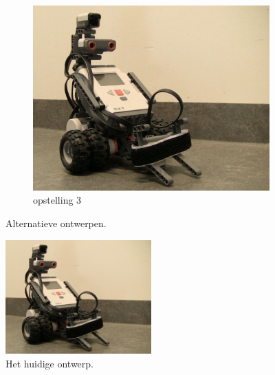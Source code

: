 \documentclass[tt3]{penoverslag}
\begin{document}
\begin{figure}
\begin{subfigure}[h]{0.325\textwidth}
		\centering
		\includegraphics[width=\textwidth]{robotOud3}
		\caption{opstelling 3}
		\label{fig:robotOud3}
	\end{subfigure}
\caption{Alternatieve ontwerpen.}
\label{fig:robotOud}
\end{figure}

\begin{figure}
\centering
	\includegraphics[width=0.5\textwidth]{robotNieuw}
\caption{Het huidige ontwerp.}
\label{fig:robotBouw}
\end{figure}
\end{document}
